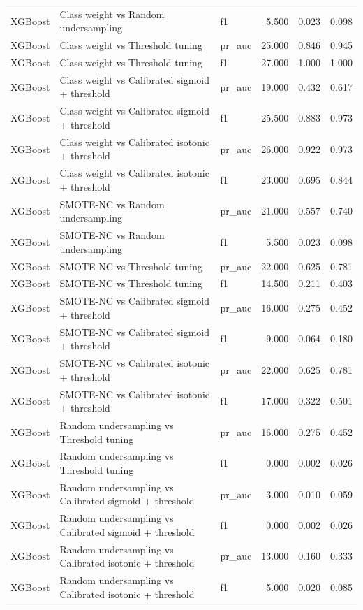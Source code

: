 \begin{tabular}{lllrrr}
XGBoost & Class weight vs Random undersampling & f1 & 5.500 & 0.023 & 0.098 \\
XGBoost & Class weight vs Threshold tuning & pr_auc & 25.000 & 0.846 & 0.945 \\
XGBoost & Class weight vs Threshold tuning & f1 & 27.000 & 1.000 & 1.000 \\
XGBoost & Class weight vs Calibrated sigmoid + threshold & pr_auc & 19.000 & 0.432 & 0.617 \\
XGBoost & Class weight vs Calibrated sigmoid + threshold & f1 & 25.500 & 0.883 & 0.973 \\
XGBoost & Class weight vs Calibrated isotonic + threshold & pr_auc & 26.000 & 0.922 & 0.973 \\
XGBoost & Class weight vs Calibrated isotonic + threshold & f1 & 23.000 & 0.695 & 0.844 \\
XGBoost & SMOTE-NC vs Random undersampling & pr_auc & 21.000 & 0.557 & 0.740 \\
XGBoost & SMOTE-NC vs Random undersampling & f1 & 5.500 & 0.023 & 0.098 \\
XGBoost & SMOTE-NC vs Threshold tuning & pr_auc & 22.000 & 0.625 & 0.781 \\
XGBoost & SMOTE-NC vs Threshold tuning & f1 & 14.500 & 0.211 & 0.403 \\
XGBoost & SMOTE-NC vs Calibrated sigmoid + threshold & pr_auc & 16.000 & 0.275 & 0.452 \\
XGBoost & SMOTE-NC vs Calibrated sigmoid + threshold & f1 & 9.000 & 0.064 & 0.180 \\
XGBoost & SMOTE-NC vs Calibrated isotonic + threshold & pr_auc & 22.000 & 0.625 & 0.781 \\
XGBoost & SMOTE-NC vs Calibrated isotonic + threshold & f1 & 17.000 & 0.322 & 0.501 \\
XGBoost & Random undersampling vs Threshold tuning & pr_auc & 16.000 & 0.275 & 0.452 \\
XGBoost & Random undersampling vs Threshold tuning & f1 & 0.000 & 0.002 & 0.026 \\
XGBoost & Random undersampling vs Calibrated sigmoid + threshold & pr_auc & 3.000 & 0.010 & 0.059 \\
XGBoost & Random undersampling vs Calibrated sigmoid + threshold & f1 & 0.000 & 0.002 & 0.026 \\
XGBoost & Random undersampling vs Calibrated isotonic + threshold & pr_auc & 13.000 & 0.160 & 0.333 \\
XGBoost & Random undersampling vs Calibrated isotonic + threshold & f1 & 5.000 & 0.020 & 0.085 \\

\end{tabular}
